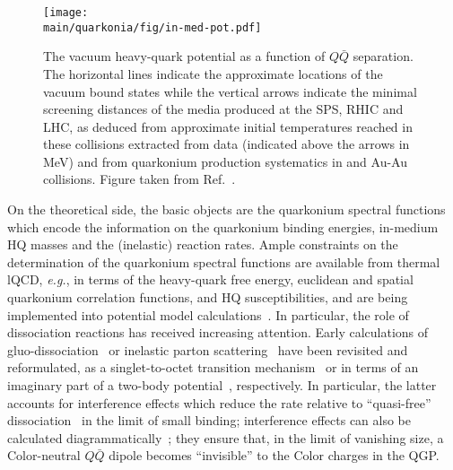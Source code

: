 \documentclass[../report.tex]{subfiles}
\providecommand{\main}{..}
\begin{document}
\begin{figure}[!h]
\begin{center}
\texttt{[image: \\main/quarkonia/fig/in-med-pot.pdf]}
\end{center}
\vspace{-0.5cm}
\caption{The vacuum heavy-quark potential as a function of $Q\bar Q$ separation. The horizontal lines indicate the approximate locations of the vacuum bound states while the vertical arrows indicate the minimal screening distances of the media produced at the SPS, RHIC and LHC, as deduced from approximate initial temperatures reached in these collisions extracted from data (indicated above the arrows in MeV) and from quarkonium production systematics in \PbPb and Au-Au collisions. Figure taken from Ref.~\cite{Rapp:2017chc}.}
\label{FigQ:pot}
\end{figure}

On the theoretical side, the basic objects are the quarkonium spectral functions which encode the information on the quarkonium binding energies, in-medium HQ masses and the (inelastic) reaction rates.  Ample constraints on the determination of the quarkonium spectral functions are available from thermal lQCD, {\it e.g.}, in terms of the heavy-quark free energy, euclidean and spatial quarkonium correlation functions, and HQ susceptibilities, and are being implemented into potential model calculations~\cite{Wong:2004zr,Mocsy:2005qw,Alberico:2006vw,Brambilla:2008cx,Riek:2010py,Burnier:2015tda,Liu:2017qah}.
In particular, the role of dissociation reactions has received increasing attention. Early calculations of gluo-dissociation~\cite{Bhanot:1979vb,Kharzeev:1994pz} or inelastic parton scattering~\cite{Grandchamp:2001pf} have been revisited and reformulated, \eg as a singlet-to-octet transition mechanism~\cite{Brambilla:2008cx} or in terms of an imaginary part of a two-body potential~\cite{Laine:2006ns}, respectively. In particular, the latter accounts for interference effects which reduce the rate relative to ``quasi-free'' dissociation~\cite{Grandchamp:2001pf} in the limit of small binding; interference effects can also be calculated diagrammatically~\cite{Park:2007zza}; they ensure that, in the limit of vanishing size, a Color-neutral $Q\bar Q$ dipole becomes ``invisible'' to the Color charges in the QGP.
\end{document}
